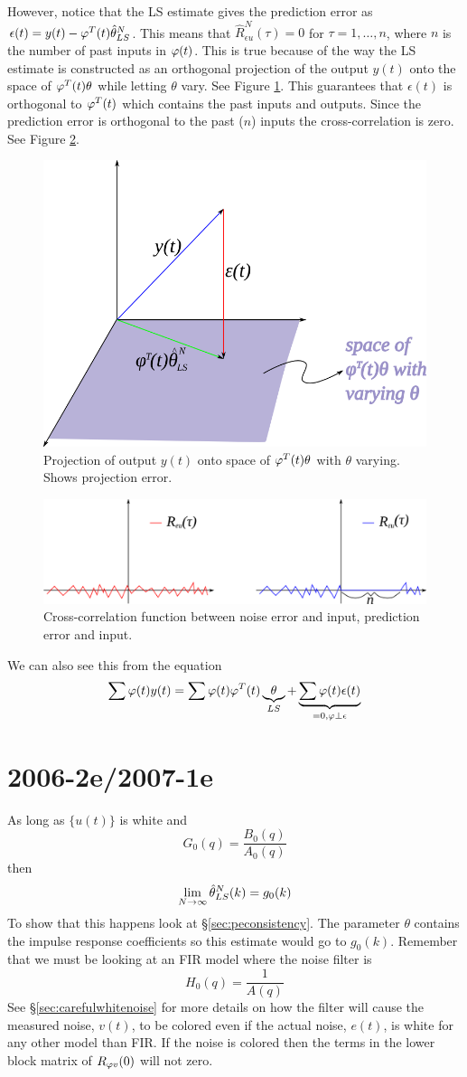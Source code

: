 However, notice that the LS estimate gives the prediction error as $\epsilon(t)=y(t)-\varphi^T(t)\hat{\theta}_{LS}^N$. This means that $\hat{R}_{\epsilon u}^N(\tau)=0$ for $\tau=1,\ldots,n$, where $n$ is the number of past inputs in $\varphi(t)$. This is true because of the way the LS estimate is constructed as an orthogonal projection of the output $y(t)$ onto the space of $\varphi^T(t)\theta$ while letting $\theta$ vary. See Figure \ref{fig:mt062d2}. This guarantees that $\epsilon(t)$ is orthogonal to $\varphi^T(t)$ which contains the past inputs and outputs. Since the prediction error is orthogonal to the past ($n$) inputs the cross-correlation is zero. See Figure \ref{fig:mt062d1}.

\begin{figure}[ht!]
  \centering
  \includegraphics[width=.5\textwidth]{images/mt062d2}
  \caption{Projection of output $y(t)$ onto space of $\varphi^T(t)\theta$ with $\theta$ varying. Shows projection error.}
  \label{fig:mt062d2}
\end{figure}

\begin{figure}[ht!]
  \centering
  \includegraphics[width=.5\textwidth]{images/mt062d1}
  \caption{Cross-correlation function between noise error and input, prediction error and input.}
  \label{fig:mt062d1}
\end{figure}

We can also see this from the equation
$$\sum\varphi(t)y(t) = \sum\varphi(t)\varphi^T(t)\underbrace{\theta}_{LS} + \underbrace{\sum\varphi(t)\epsilon(t)}_{=0, \varphi\perp\epsilon}$$

\section{2006-2e/2007-1e}
As long as $\{u(t)\}$ is white and
$$G_0(q)=\frac{B_0(q)}{A_0(q)}$$
then
$$\lim_{N\to\infty}\hat{\theta}_{LS}^N(k)=g_0(k)$$
To show that this happens look at \S\ref{sec:peconsistency}. The parameter $\theta$ contains the impulse response coefficients so this estimate would go to $g_0(k)$. Remember that we must be looking at an FIR model where the noise filter is
$$H_0(q)=\frac{1}{A(q)}$$
See \S\ref{sec:carefulwhitenoise} for more details on how the filter will cause the measured noise, $v(t)$, to be colored even if the actual noise, $e(t)$, is white for any other model than FIR. If the noise is colored then the terms in the lower block matrix of $R_{\varphi v}(0)$ will not zero.

